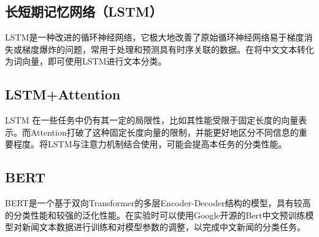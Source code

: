 \documentclass[sigplan]{acmart}
\begin{document}
\subsection{长短期记忆网络（LSTM）}
\hspace{2.0em}LSTM\cite{hochreiter1997long}是一种改进的循环神经网络，它极大地改善了原始循环神经网络易于梯度消失或梯度爆炸的问题，常用于处理和预测具有时序关联的数据。在将中文文本转化为词向量，即可使用LSTM进行文本分类。
\subsection{LSTM+Attention}
\hspace{2.0em}LSTM 在一些任务中仍有其一定的局限性，比如其性能受限于固定长度的向量表示。而Attention打破了这种固定长度向量的限制，并能更好地区分不同信息的重要程度。将LSTM与注意力机制结合使用，可能会提高本任务的分类性能。
\subsection{BERT}
\hspace{2.0em}BERT是一个基于双向Transformer的多层Encoder-Decoder结构的模型，具有较高的分类性能和较强的泛化性能。在实验时可以使用Google开源的Bert中文预训练模型对新闻文本数据进行训练和对模型参数的调整，以完成中文新闻的分类任务。



		

%
		
		
		
\end{document}
